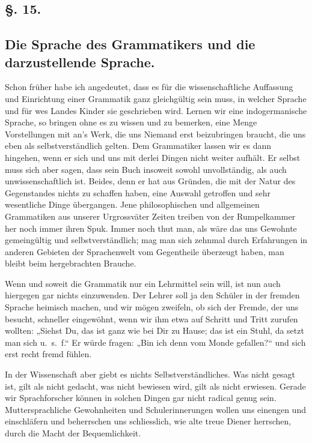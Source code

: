 \label{fp.127}

\subsection*{§. 15.}\label{II.VI.15}
\subsection*{Die Sprache des Grammatikers und die darzustellende Sprache.}

Schon früher habe ich angedeutet, dass es für die wissenschaftliche Auffassung und Einrichtung einer Grammatik ganz gleichgültig sein muss, in welcher Sprache und für wes Landes Kinder sie geschrieben wird. Lernen wir eine indogermanische Sprache, so bringen  ohne es zu wissen und zu bemerken, eine Menge Vorstellungen mit an’s Werk, die uns Niemand erst beizubringen braucht, die uns eben als selbstverständlich gelten. Dem Grammatiker lassen wir es dann hingehen, wenn er sich und uns mit derlei Dingen nicht weiter aufhält. Er selbst muss sich aber sagen, dass sein Buch insoweit sowohl unvollständig, als auch unwissenschaftlich ist. Beides, denn er hat aus Gründen, die mit der Natur des Gegenstandes nichts zu schaffen haben, eine Auswahl getroffen und sehr wesentliche Dinge übergangen. Jene philosophischen und allgemeinen Grammatiken aus unserer Urgrossväter Zeiten treiben von der Rumpelkammer her noch immer ihren Spuk. Immer noch thut man, als wäre das uns Gewohnte gemeingültig und selbstverständlich; mag man sich zehnmal durch Erfahrungen in anderen Gebieten der Sprachenwelt vom Gegentheile überzeugt haben, man bleibt beim hergebrachten Brauche.

Wenn und soweit die Grammatik nur ein Lehrmittel sein will, ist nun auch hiergegen gar nichts einzuwenden. Der Lehrer soll ja den Schüler in der fremden Sprache heimisch machen, und wir mögen zweifeln, ob sich der Fremde, der uns besucht, schneller eingewöhnt, wenn wir ihm etwa auf Schritt und Tritt zurufen wollten: „Siehst Du, das ist ganz wie bei Dir zu Hause; das ist ein Stuhl, da setzt man sich  u.~s.~f.“ Er würde fragen: „Bin ich denn vom Monde gefallen?“ und sich erst recht fremd fühlen.

In der Wissenschaft aber giebt es nichts Selbstverständliches. Was nicht gesagt ist, gilt als nicht gedacht, was nicht bewiesen wird, gilt als nicht erwiesen. Gerade wir Sprachforscher können in solchen Dingen gar nicht radical genug sein. Muttersprachliche Gewohnheiten und Schulerinnerungen wollen uns einengen und einschläfern und beherrschen uns schliesslich, wie alte treue Diener herrschen, durch die Macht der Bequemlichkeit.

